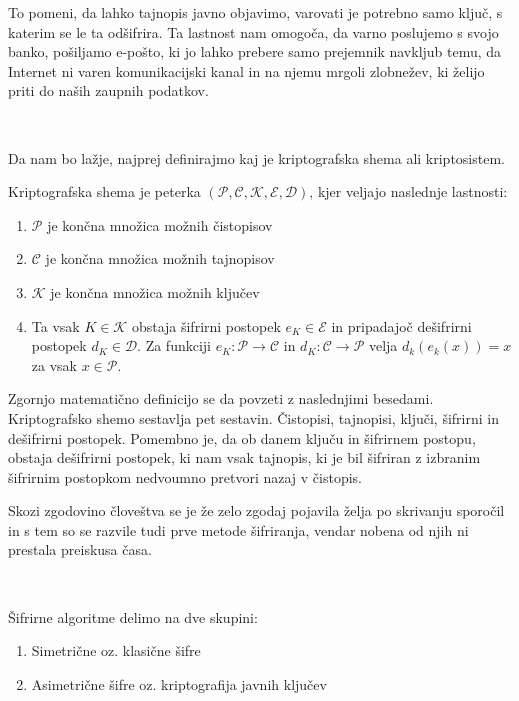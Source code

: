 \documentclass[12pt,a4paper,openany]{book}
\begin{document}
To pomeni, da lahko tajnopis javno objavimo, varovati je potrebno samo ključ, s katerim se le ta odšifrira. Ta lastnost nam omogoča, da varno poslujemo s svojo banko, pošiljamo e-pošto, ki jo lahko prebere samo prejemnik navkljub temu, da Internet ni varen komunikacijski kanal in na njemu mrgoli zlobnežev, ki želijo priti do naših zaupnih podatkov.

\

Da nam bo lažje, najprej definirajmo kaj je kriptografska shema ali kriptosistem.

\begin{mdframed}[frametitle={Kriptografska shema}]
Kriptografska shema je peterka  $(\mathcal{P}, \mathcal{C}, \mathcal{K},  \mathcal{E}, \mathcal{D})$, kjer veljajo naslednje lastnosti:
	\begin{enumerate}
		\item $\mathcal{P}$ je končna množica možnih čistopisov
		\item $\mathcal{C}$ je končna množica možnih tajnopisov
		\item $\mathcal{K}$ je končna množica možnih ključev
		\item Ta vsak $K \in \mathcal{K}$ obstaja šifrirni postopek $e_K \in \mathcal{E}$ in pripadajoč dešifrirni postopek $d_K \in \mathcal{D}$. Za funkciji $e_K: \mathcal{P} \rightarrow \mathcal{C}$ in $d_K: \mathcal{C} \rightarrow \mathcal{P}$ velja $d_k(e_k(x)) = x$ za vsak $x \in \mathcal{P}$.
	\end{enumerate}
\end{mdframed}

Zgornjo matematično definicijo se da povzeti z naslednjimi besedami. Kriptografsko shemo sestavlja pet sestavin. Čistopisi, tajnopisi, ključi, šifrirni in dešifrirni postopek. Pomembno je, da ob danem ključu in šifrirnem postopu, obstaja dešifrirni postopek, ki nam vsak tajnopis, ki je bil šifriran z izbranim šifrirnim postopkom nedvoumno pretvori nazaj v čistopis.

Skozi zgodovino človeštva se je že zelo zgodaj pojavila želja po skrivanju sporočil in s tem so se razvile tudi prve metode šifriranja, vendar nobena od njih ni prestala preiskusa časa.

\

Šifrirne algoritme delimo na dve skupini:
\begin{enumerate}

	\item Simetrične oz. klasične šifre
	\item Asimetrične šifre oz. kriptografija javnih ključev

\end{enumerate}
\end{document}
